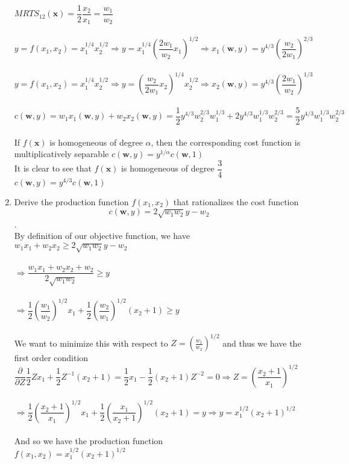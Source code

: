 \documentclass[11pt]{article}
\begin{document}
\begin{enumerate}
\medskip\\
$MRTS_{12}(\textbf{x})=\dfrac{1}{2}\dfrac{x_2}{x_1}=\dfrac{w_1}{w_2}$\\\\
$y=f(x_1,x_2)=x_1^{1/4}x_2^{1/2}\Rightarrow y=x_1^{1/4}(\dfrac{2w_1}{w_2}x_1)^{1/2}\Rightarrow x_1(\textbf{w},y)=y^{4/3}(\dfrac{w_2}{2w_1})^{2/3}$\\\\
$y=f(x_1,x_2)=x_1^{1/4}x_2^{1/2}\Rightarrow y=(\dfrac{w_2}{2w_1}x_2)^{1/4}x_2^{1/2}\Rightarrow x_2(\textbf{w},y)=y^{4/3}(\dfrac{2w_1}{w_2})^{1/3}$\\\\
$c(\textbf{w},y)=w_1x_1(\textbf{w},y)+w_2x_2(\textbf{w},y)=
\dfrac{1}{2}y^{4/3}w_2^{2/3}w_1^{1/3}+2y^{4/3}w_1^{1/3}w_2^{2/3}=\dfrac{5}{2}y^{4/3}w_1^{1/3}w_2^{2/3}$\\\\
If $f(\textbf{x})$ is homogeneous of degree $\alpha$, then the corresponding cost function is multiplicatively separable $c(\textbf{w},y)=y^{1/\alpha}c(\textbf{w},1)$\\
It is clear to see that $f(\textbf{x})$ is homogeneous of degree $\dfrac{3}{4}$\\
$c(\textbf{w},y)=y^{4/3}c(\textbf{w},1)$\\ 
\item Derive the production function $f(x_{1},x_{2})$ that rationalizes the cost function
$$c(\mathbf{w},y)=2\sqrt{w_{1}w_{2}}y-w_{2}$$.
\medskip\\ 
By definition of our objective function, we have\\
$w_1x_1+w_2x_2\geq2\sqrt{w_1w_2}y-w_2$\\\\
$\Rightarrow \dfrac{w_1x_1+w_2x_2+w_2}{2\sqrt{w_1w_2}}\geq y$\\\\
$\Rightarrow \dfrac{1}{2}(\dfrac{w_1}{w_2})^{1/2}x_1+\dfrac{1}{2}(\dfrac{w_2}{w_1})^{1/2}(x_2+1)\geq y$\\\\
We want to minimize this with respect to $Z=(\frac{w_1}{w_2})^{1/2}$ and thus we have the first order condition\\
$\dfrac{\partial}{\partial Z}\dfrac{1}{2}Zx_1+\dfrac{1}{2}Z^{-1}(x_2+1)=\dfrac{1}{2}x_1-\dfrac{1}{2}(x_2+1)Z^{-2}=0\Rightarrow Z=(\dfrac{x_2+1}{x_1})^{1/2}$\\\\
$\Rightarrow \dfrac{1}{2}(\dfrac{x_2+1}{x_1})^{1/2}x_1+\dfrac{1}{2}(\dfrac{x_1}{x_2+1})^{1/2}(x_2+1)=y\Rightarrow y=x_1^{1/2}(x_2+1)^{1/2}$\\\\
And so we have the production function\\
$f(x_1,x_2)=x_1^{1/2}(x_2+1)^{1/2}$
\end{enumerate}
\end{document}
